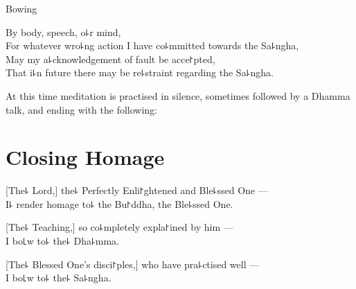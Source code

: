 \begin{instruction}
  Bowing
\end{instruction}

By body, speech, o꜕r mind,\\
For whatever wro꜕ng action I have co꜕mmitted towards the Sa꜕ngha,\\
May my a꜕cknowledgement of fault be acce꜓pted,\\
That i꜕n future there may be re꜕straint regarding the Sa꜕ngha.

\vfill

\begin{instruction}
  At this time meditation is practised in silence, sometimes followed by a Dhamma talk, and ending with the following:
\end{instruction}

\chEnglish
\chapter{Closing Homage}%

[The꜕ Lord,] the꜕ Perfectly Enli꜓ghtened and Ble꜕ssed One ---\\
I꜕ render homage to꜕ the Bu꜓ddha, the Ble꜕ssed One. 

[The꜕ Teaching,] so co꜕mpletely expla꜓ined by him ---\\
I bo꜖w to꜕ the꜕ Dha꜕mma. 

[The꜕ Blessed One's disci꜓ples,] who have pra꜕ctised well ---\\
I bo꜖w to꜕ the꜕ Sa꜕ngha. 


